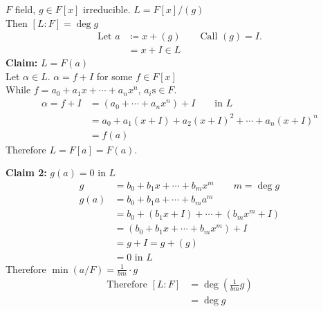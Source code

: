\prop $F$ field, $g\in F[x]$ irreducible.  $L=F[x]/(g)$ \\
Then $[L:F]=\deg g$ \\
\pf\vspace{-\baselineskip}
\begin{align*}
\text{Let } a &\coloneqq x + (g) \qquad\text{Call $(g)=I$.} \\
&= x + I \in L
\end{align*}
\textbf{Claim:} $L=F(a)$ \\
\pf Let $\alpha\in L$.  $\alpha=f+I$ for some $f\in F[x]$ \\
While $f=a_0+a_1x+\dotsb+a_nx^n$, $a_i\text{s}\in F$.
\begin{align*}
\alpha = f + I &= (a_0+\dotsb+a_nx^n) + I \qquad\text{in $L$} \\
&= a_0 + a_1(x+I) + a_2(x+I)^2 + \dotsb + a_n(x+I)^n \\
&= f(a) 
\end{align*}
Therefore $L=F[a]=F(a)$.

\textbf{Claim 2:} $g(a)=0$ in $L$ \\
\pf\vspace{-\baselineskip}
\begin{align*}
g &= b_0 + b_1x + \dotsb + b_mx^m \qquad m=\deg g \\
g(a) &= b_0 + b_1a + \dotsb + b_ma^m \\
&= b_0 + (b_1x+I) + \dotsb + (b_mx^m+I) \\
&= (b_0+b_1x+\dotsb+b_mx^m) + I \\
&= g + I = g + (g) \\
&= \text{$0$ in $L$}
\end{align*}
Therefore $\min(a/F)=\frac{1}{bm}\cdot g$
\begin{align*}
\text{Therefore } [L:F] &= \deg(\tfrac{1}{bm}g) \\
&= \deg g
\end{align*}
